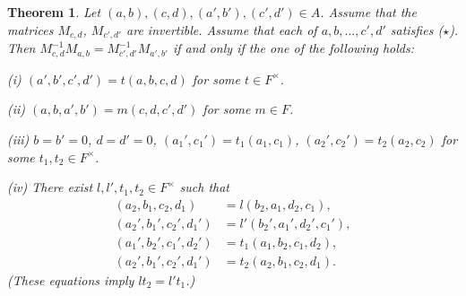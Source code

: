 \documentclass{article}
\newtheorem{thm}{Theorem}[section]
\begin{document}
\begin{thm}
Let $(a,b), (c,d), (a',b'), (c',d')\in A$.
Assume that the matrices $M_{c,d}$, $M_{c',d'}$ are invertible.
Assume that each of $a,b,\dots,c',d'$ satisfies ($\star$).
Then  $M_{c,d}^{-1}M_{a,b}= M_{c',d'}^{-1}M_{a',b'}$ if and only if the one of the following holds:

 
(i) $(a',b',c',d')=t(a,b,c,d)$ for some $t\in F^{\times}$.

(ii) $(a,b,a',b')=m(c,d,c',d')$ for some $m\in F$.

(iii) $b=b'=0$, $d=d'=0$, $(a_1',c_1')=t_1(a_1,c_1)$, $(a_2',c_2')=t_2(a_2,c_2)$ for some $t_1,t_2\in F^{\times}$.

(iv) There exist $l,l',t_1,t_2\in F^{\times}$ such that
\begin{align*}
(a_2,b_1,c_2,d_1)&=l(b_2,a_1,d_2,c_1),\\
(a_2',b_1',c_2',d_1')&=l'(b_2',a_1',d_2',c_1'),\\
(a_1',b_2',c_1',d_2')&=t_1(a_1,b_2,c_1,d_2),\\
(a_2',b_1',c_2',d_1')&=t_2(a_2,b_1,c_2,d_1).
\end{align*}
(These equations imply $l t_2=l' t_1$.)

\end{thm}
\end{document}
